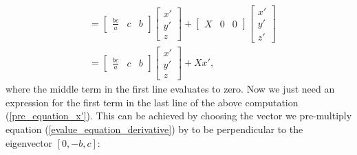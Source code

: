 \documentclass[preprint,12pt]{elsarticle}
\begin{document}
\begin{align}
    &=  \begin{bmatrix}
            \frac{bc}{a} & c & b
        \end{bmatrix}   \begin{bmatrix}
                            x'\\
                            y'\\
                            z\
                        \end{bmatrix}+  \begin{bmatrix}
                                            X & 0 & 0
                                        \end{bmatrix}   \begin{bmatrix}
                                                            x'\\
                                                            y'\\
                                                            z'    
                                                        \end{bmatrix}\nonumber\\
    &=  \begin{bmatrix}
            \frac{bc}{a} & c & b
        \end{bmatrix}   \begin{bmatrix}
                            x'\\
                            y'\\
                            z\
                        \end{bmatrix}+Xx',
\end{align}
where the middle term  in the first line evaluates to zero. Now we just need an expression for the first term in the last line of the above computation (\ref{pre_equation_x'}). This can be achieved by choosing the vector we pre-multiply equation (\ref{evalue_equation_derivative}) by to be perpendicular to the eigenvector $[0,-b,c]$:
\end{document}
